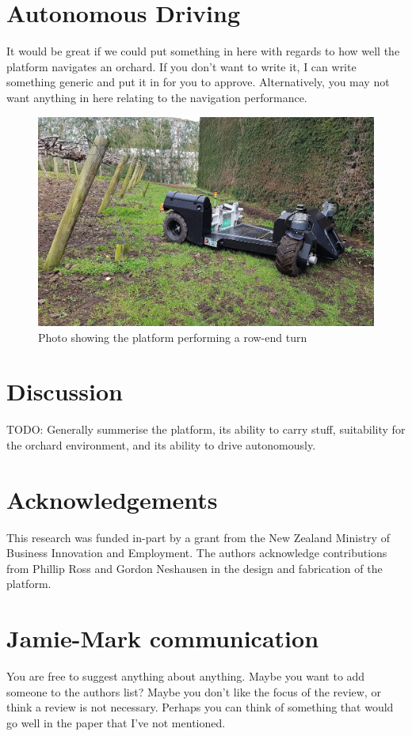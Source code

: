 \documentclass[preprint,authoryear,12pt]{elsarticle}
\begin{document}
\section{Autonomous Driving}
\label{sect:autonomous}
    \color{red}
        It would be great if we could put something in here with regards to how well the platform navigates an orchard.
        If you don't want to write it, I can write something generic and put it in for you to approve.
        Alternatively, you may not want anything in here relating to the navigation performance.
    \color{black}
    \begin{figure}[htb]
        \centering
        \includegraphics[width=\linewidth]{imgs/photos/suzy_turning.jpg}
        \caption{
            Photo showing the platform performing a row-end turn
        }
        \label{fig:suzy_turning}
    \end{figure}

\section{Discussion}
    TODO: Generally summerise the platform, its ability to carry stuff, suitability for the orchard environment, and its ability to drive autonomously.

\section*{Acknowledgements}
This research was funded in-part by a grant from the New Zealand Ministry of Business Innovation and Employment.
The authors acknowledge contributions from Phillip Ross and Gordon Neshausen in the design and fabrication of the platform.

\section{Jamie-Mark communication}
You are free to suggest anything about anything.
Maybe you want to add someone to the authors list?
Maybe you don't like the focus of the review, or think a review is not necessary.
Perhaps you can think of something that would go well in the paper that I've not mentioned.
\end{document}
